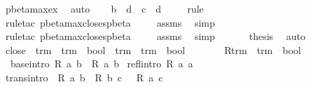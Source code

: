 \begin{isabellebody}
\ pbeta{\isacharunderscore}max{\isacharunderscore}ex\ \isamarkupfalse%
\ auto\isanewline
\ \ \isamarkupfalse%
\ {\isachardoublequoteopen}b\ {\isasymggreater}\ d\ {\isasymand}\ c\ {\isasymggreater}\ d{\isachardoublequoteclose}\ \isanewline
\ \ \isamarkupfalse%
\ rule\ \isanewline
\ \ \isamarkupfalse%
\ {\isacharparenleft}rule{\isacharunderscore}tac\ pbeta{\isacharunderscore}max{\isacharunderscore}closes{\isacharunderscore}pbeta{\isacharparenright}\isanewline
\ \ \isamarkupfalse%
\ {}\ assms\ \isamarkupfalse%
\ simp{\isacharplus}\isanewline
\ \ \isamarkupfalse%
\ {\isacharparenleft}rule{\isacharunderscore}tac\ pbeta{\isacharunderscore}max{\isacharunderscore}closes{\isacharunderscore}pbeta{\isacharparenright}\isanewline
\ \ \isamarkupfalse%
\ {}\ assms\ \isamarkupfalse%
\ simp{\isacharplus}\isanewline
\ \ \isamarkupfalse%
\isanewline
\ \ \isamarkupfalse%
\ {\isacharquery}thesis\ \isamarkupfalse%
\ auto\isanewline
{}\isamarkupfalse%
%
\endisatagproof
{\isafoldproof}%
%
\isadelimproof
%
\endisadelimproof
%
\isamarkuptrue%
\isamarkupfalse%
\ close\ {\isacharcolon}{\isacharcolon}\ {\isachardoublequoteopen}{\isacharparenleft}trm\ {\isasymRightarrow}\ trm\ {\isasymRightarrow}\ bool{\isacharparenright}\ {\isasymRightarrow}\ trm\ {\isasymRightarrow}\ trm\ {\isasymRightarrow}\ bool{\isachardoublequoteclose}\ {\isacharparenleft}{\isachardoublequoteopen}{\isacharunderscore}{\isacharasterisk}\ {\isacharunderscore}\ \ {\isacharunderscore}{\isachardoublequoteclose}\ {\isacharbrackleft}{}{}{\isacharcomma}{}{}{\isacharbrackright}\ {}{}{\isacharparenright}\ \ R{\isacharcolon}{\isacharcolon}{\isachardoublequoteopen}trm\ {\isasymRightarrow}\ trm\ {\isasymRightarrow}\ bool{\isachardoublequoteclose}\isanewline
{}\isanewline
\ \ base{\isacharbrackleft}intro{\isacharbrackright}{\isacharcolon}\ {\isachardoublequoteopen}R\ a\ b\ {\isasymLongrightarrow}\ R{\isacharasterisk}\ a\ b{\isachardoublequoteclose}\isanewline
{\isacharbar}\ refl{\isacharbrackleft}intro{\isacharbrackright}{\isacharcolon}\ {\isachardoublequoteopen}R{\isacharasterisk}\ a\ a{\isachardoublequoteclose}\isanewline
{\isacharbar}\ trans{\isacharbrackleft}intro{\isacharbrackright}{\isacharcolon}\ {\isachardoublequoteopen}{\isasymlbrakk}\ R{\isacharasterisk}\ a\ b\ {\isacharsemicolon}\ R{\isacharasterisk}\ b\ c\ {\isasymrbrakk}\ {\isasymLongrightarrow}\ R{\isacharasterisk}\ a\ c{\isachardoublequoteclose}%

\end{isabellebody}
